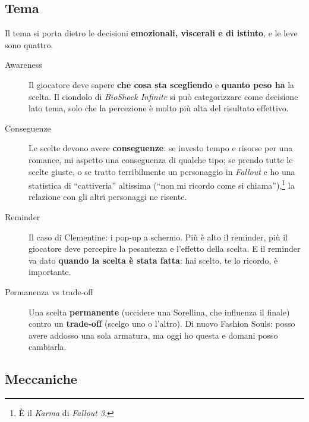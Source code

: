 \subsection{Tema}

Il tema si porta dietro le decisioni \textbf{emozionali, viscerali e di
istinto}, e le leve sono quattro.
\begin{description}
  \item[Awareness] Il giocatore deve sapere \textbf{che cosa sta
        scegliendo} e \textbf{quanto peso ha} la scelta. Il ciondolo di
        \emph{BioShock Infinite} si può categorizzare come decisione lato
        tema, solo che la percezione è molto più alta del risultato
        effettivo.
  \item[Conseguenze] Le scelte devono avere \textbf{conseguenze}: se investo
        tempo e risorse per una romance, mi aspetto una conseguenza di
        qualche tipo; se prendo tutte le scelte giuste, o se tratto
        terribilmente un personaggio in \emph{Fallout} e ho una statistica
        di ``cattiveria'' altissima (``non mi ricordo come si
        chiama''),\footnote{È il \emph{Karma} di \emph{Fallout 3}.} la
        relazione con gli altri personaggi ne risente.
  \item[Reminder] Il caso di Clementine: i pop-up a schermo. Più è alto il
        reminder, più il giocatore deve percepire la pesantezza e l'effetto
        della scelta. E il reminder va dato \textbf{quando la scelta è stata
        fatta}: hai scelto, te lo ricordo, è importante.
  \item[Permanenza vs trade-off] Una scelta \textbf{permanente} (uccidere una
        Sorellina, che influenza il finale) contro un \textbf{trade-off}
        (scelgo uno o l'altro). Di nuovo Fashion Souls: posso avere addosso
        una sola armatura, ma oggi ho questa e domani posso cambiarla.
\end{description}

\subsection{Meccaniche}

